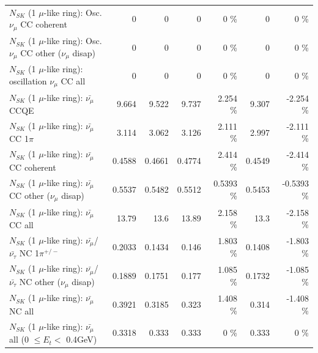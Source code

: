 \begin{table}
\begin{tabular}{| l | r | r | r  r | r  r |}
                        $N_{SK}$ (1 $\mu$-like ring): Osc. $\nu_\mu$ CC coherent &               0 &               0 &               0 &        0 \%  &               0 &        0 \%  \\ 
         $N_{SK}$ (1 $\mu$-like ring): Osc. $\nu_\mu$ CC other ($\nu_\mu$ disap) &               0 &               0 &               0 &        0 \%  &               0 &        0 \%  \\ 
                      $N_{SK}$ (1 $\mu$-like ring): oscillation $\nu_\mu$ CC all &               0 &               0 &               0 &        0 \%  &               0 &        0 \%  \\ 
\hline
\hline
                              $N_{SK}$ (1 $\mu$-like ring): $\bar{\nu_\mu}$ CCQE &           9.664 &           9.522 &           9.737 &    2.254 \%  &           9.307 &   -2.254 \%  \\ 
                         $N_{SK}$ (1 $\mu$-like ring): $\bar{\nu_\mu}$ CC 1$\pi$ &           3.114 &           3.062 &           3.126 &    2.111 \%  &           2.997 &   -2.111 \%  \\ 
                       $N_{SK}$ (1 $\mu$-like ring): $\bar{\nu_\mu}$ CC coherent &          0.4588 &          0.4661 &          0.4774 &    2.414 \%  &          0.4549 &   -2.414 \%  \\ 
        $N_{SK}$ (1 $\mu$-like ring): $\bar{\nu_\mu}$ CC other ($\nu_\mu$ disap) &          0.5537 &          0.5482 &          0.5512 &   0.5393 \%  &          0.5453 &  -0.5393 \%  \\ 
                          $N_{SK}$ (1 $\mu$-like ring): $\bar{\nu_{\mu}}$ CC all &           13.79 &            13.6 &           13.89 &    2.158 \%  &            13.3 &   -2.158 \%  \\ 
\hline
  $N_{SK}$ (1 $\mu$-like ring): $\bar{\nu_\mu}$/$\bar{\nu_\tau}$ NC 1$\pi^{+/-}$ &          0.2033 &          0.1434 &           0.146 &    1.803 \%  &          0.1408 &   -1.803 \%  \\ 
$N_{SK}$ (1 $\mu$-like ring): $\bar{\nu_\mu}$/$\bar{\nu_\tau}$ NC other ($\nu_\mu$ disap) &          0.1889 &          0.1751 &           0.177 &    1.085 \%  &          0.1732 &   -1.085 \%  \\ 
                          $N_{SK}$ (1 $\mu$-like ring): $\bar{\nu_{\mu}}$ NC all &          0.3921 &          0.3185 &           0.323 &    1.408 \%  &           0.314 &   -1.408 \%  \\ 
\hline
   $N_{SK}$ (1 $\mu$-like ring): $\bar{\nu_{\mu}}$ all (0 $\leq E_{t} <$ 0.4GeV) &          0.3318 &           0.333 &           0.333 &        0 \%  &           0.333 &        0 \%  \\ 

\end{tabular}
\end{table}
